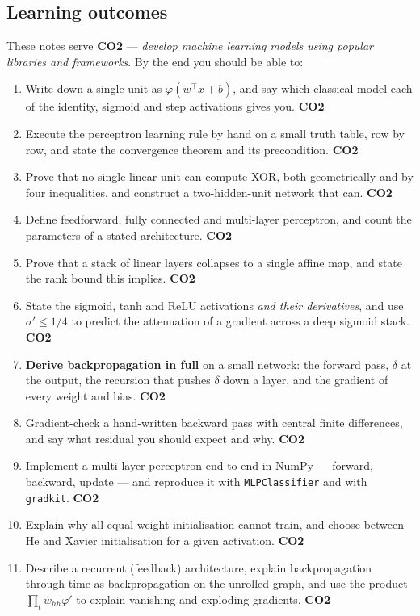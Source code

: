 \documentclass[11pt]{article}
\begin{document}
\subsection{Learning outcomes}

These notes serve \textbf{CO2} --- \emph{develop machine learning models using
popular libraries and frameworks}. By the end you should be able to:

\begin{enumerate}[leftmargin=*]
  \item Write down a single unit as $\varphi(w^\top x + b)$, and say which
    classical model each of the identity, sigmoid and step activations gives
    you. \hfill \textbf{CO2}
  \item Execute the perceptron learning rule by hand on a small truth table,
    row by row, and state the convergence theorem and its precondition.
    \hfill \textbf{CO2}
  \item Prove that no single linear unit can compute XOR, both geometrically
    and by four inequalities, and construct a two-hidden-unit network that
    can. \hfill \textbf{CO2}
  \item Define feedforward, fully connected and multi-layer perceptron, and
    count the parameters of a stated architecture. \hfill \textbf{CO2}
  \item Prove that a stack of linear layers collapses to a single affine map,
    and state the rank bound this implies. \hfill \textbf{CO2}
  \item State the sigmoid, tanh and ReLU activations \emph{and their
    derivatives}, and use $\sigma' \le 1/4$ to predict the attenuation of a
    gradient across a deep sigmoid stack. \hfill \textbf{CO2}
  \item \textbf{Derive backpropagation in full} on a small network: the
    forward pass, $\delta$ at the output, the recursion that pushes $\delta$
    down a layer, and the gradient of every weight and bias.
    \hfill \textbf{CO2}
  \item Gradient-check a hand-written backward pass with central finite
    differences, and say what residual you should expect and why.
    \hfill \textbf{CO2}
  \item Implement a multi-layer perceptron end to end in NumPy --- forward,
    backward, update --- and reproduce it with
    \texttt{MLPClassifier} and with \texttt{gradkit}. \hfill \textbf{CO2}
  \item Explain why all-equal weight initialisation cannot train, and choose
    between He and Xavier initialisation for a given activation.
    \hfill \textbf{CO2}
  \item Describe a recurrent (feedback) architecture, explain backpropagation
    through time as backpropagation on the unrolled graph, and use the product
    $\prod_t w_{hh}\varphi'$ to explain vanishing and exploding gradients.
    \hfill \textbf{CO2}
\end{enumerate}
\end{document}
